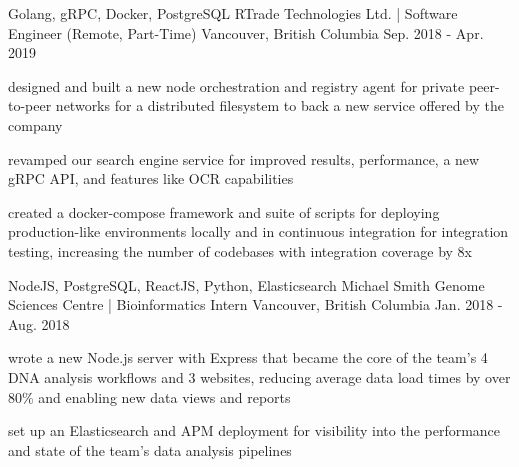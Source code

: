 \begin{cventries}
  \cventry
    {Golang, gRPC, Docker, PostgreSQL} %
    {RTrade Technologies Ltd. | Software Engineer (Remote, Part-Time)} %
    {Vancouver, British Columbia} %
    {Sep. 2018 - Apr. 2019} %
    {
      \begin{cvitems} %
        \item {designed and built a new node orchestration and registry agent for private  peer-to-peer networks for a distributed filesystem to back a new service offered by the company}
        \item {revamped our search engine service for improved results, performance, a new gRPC API, and features like OCR capabilities}
        \item {created a docker-compose framework and suite of scripts for deploying production-like environments locally and in continuous integration for integration testing, increasing the number of codebases with integration coverage by 8x}
      \end{cvitems}
    }

  \cventry
    {NodeJS, PostgreSQL, ReactJS, Python, Elasticsearch} %
    {Michael Smith Genome Sciences Centre | Bioinformatics Intern} %
    {Vancouver, British Columbia} %
    {Jan. 2018 - Aug. 2018} %
    {
      \begin{cvitems} %
        \item {wrote a new Node.js server with Express that became the core of the team’s 4 DNA analysis workflows and 3 websites, reducing average data load times by over 80\% and enabling new data views and reports}
        \item {set up an Elasticsearch and APM deployment for visibility into the performance and state of the team’s data analysis pipelines}
      \end{cvitems}
    }

\end{cventries}
